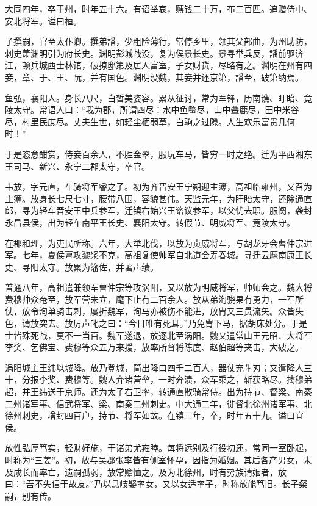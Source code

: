 \documentclass[12pt,UTF8]{ctexbook}
\begin{document}
大同四年，卒于州，时年五十六。有诏举哀，赙钱二十万，布二百匹。追赠侍中、安北将军。谥曰桓。

子撰嗣，官至太仆卿。撰弟譒，少粗险薄行，常停乡里，领其父部曲，为州助防，刺史萧渊明引为府长史。渊明彭城战没，复为侯景长史。景寻举兵反，譒前驱济江，顿兵城西士林馆，破掠邸第及居人富室，子女财货，尽略有之。渊明在州有四妾，章、于、王、阮，并有国色。渊明没魏，其妾并还京第，譒至，破第纳焉。

鱼弘，襄阳人。身长八尺，白皙美姿容。累从征讨，常为军锋，历南谯、盱眙、竟陵太守。常语人曰：“我为郡，所谓四尽：水中鱼鳖尽，山中麞鹿尽，田中米谷尽，村里民庶尽。丈夫生世，如轻尘栖弱草，白驹之过隙。人生欢乐富贵几何时！”

于是恣意酣赏，侍妾百余人，不胜金翠，服玩车马，皆穷一时之绝。迁为平西湘东王司马、新兴、永宁二郡太守，卒官。

韦放，字元直，车骑将军睿之子。初为齐晋安王宁朔迎主簿，高祖临雍州，又召为主簿。放身长七尺七寸，腰带八围，容貌甚伟。天监元年，为盱眙太守，还除通直郎，寻为轻车晋安王中兵参军，迁镇右始兴王谘议参军，以父忧去职。服阕，袭封永昌县侯，出为轻车南平王长史、襄阳太守。转假节、明威将军、竟陵太守。

在郡和理，为吏民所称。六年，大举北伐，以放为贞威将军，与胡龙牙会曹仲宗进军。七年，夏侯亶攻黎浆不克，高祖复使帅军自北道会寿春城。寻迁云麾南康王长史、寻阳太守。放累为籓佐，并著声绩。

普通八年，高祖遣兼领军曹仲宗等攻涡阳，又以放为明威将军，帅师会之。魏大将费穆帅众奄至，放军营未立，麾下止有二百余人。放从弟洵骁果有勇力，一军所仗，放令洵单骑击刺，屡折魏军，洵马亦被伤不能进，放胄又三贯流矢。众皆失色，请放突去。放厉声叱之曰：“今日唯有死耳。”乃免胄下马，据胡床处分。于是士皆殊死战，莫不一当百。魏军遂退，放逐北至涡阳。魏又遣常山王元昭、大将军李奖、乞佛宝、费穆等众五万来援，放率所督将陈度、赵伯超等夹击，大破之。

涡阳城主王纬以城降。放乃登城，简出降口四千二百人，器仗充牜刃；又遣降人三十，分报李奖、费穆等。魏人弃诸营垒，一时奔溃，众军乘之，斩获略尽。擒穆弟超，并王纬送于京师。还为太子右卫率，转通直散骑常侍。出为持节、督梁、南秦二州诸军事、信武将军、梁、南秦二州刺史。中大通二年，徙督北徐州诸军事、北徐州刺史，增封四百户，持节、将军如故。在镇三年，卒，时年五十九。谥曰宜侯。

放性弘厚笃实，轻财好施，于诸弟尤雍睦。每将远别及行役初还，常同一室卧起，时称为“三姜”。初，放与吴郡张率皆有侧室怀孕，因指为婚姻。其后各产男女，未及成长而率亡，遗嗣孤弱，放常赡恤之。及为北徐州，时有势族请姻者，放曰：“吾不失信于故友。”乃以息岐娶率女，又以女适率子，时称放能笃旧。长子粲嗣，别有传。
\end{document}
